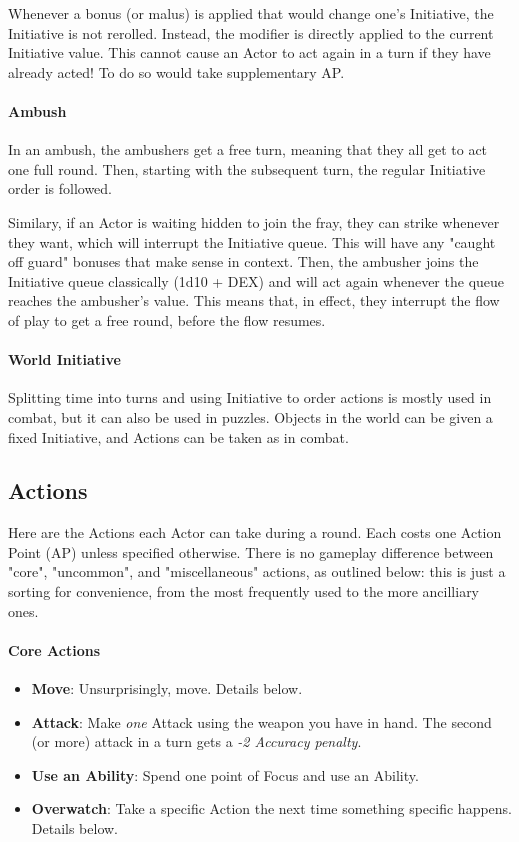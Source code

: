 Whenever a bonus (or malus) is applied that would change one's Initiative, the Initiative is not rerolled. Instead, the modifier is directly applied to the current Initiative value. This cannot cause an Actor to act again in a turn if they have already acted! To do so would take supplementary AP.


\paragraph{Ambush}

In an ambush, the ambushers get a free turn, meaning that they all get to act one full round. Then, starting with the subsequent turn, the regular Initiative order is followed.

Similary, if an Actor is waiting hidden to join the fray, they can strike whenever they want, which will interrupt the Initiative queue. This will have any "caught off guard" bonuses that make sense in context. Then, the ambusher joins the Initiative queue classically (1d10 + DEX) and will act again whenever the queue reaches the ambusher's value. This means that, in effect, they interrupt the flow of play to get a free round, before the flow resumes.

\paragraph{World Initiative} 

Splitting time into turns and using Initiative to order actions is mostly used in combat, but it can also be used in puzzles. Objects in the world can be given a fixed Initiative, and Actions can be taken as in combat. 


\subsection{Actions}
\label{actions}

Here are the Actions each Actor can take during a round. Each costs one Action Point (AP) unless specified otherwise. There is no gameplay difference between "core", "uncommon", and "miscellaneous" actions, as outlined below: this is just a sorting for convenience, from the most frequently used to the more ancilliary ones.

\paragraph{Core Actions}
\begin{itemize}
    \item \textbf{Move}: Unsurprisingly, move. Details below.
    \item \textbf{Attack}: Make \textit{one} Attack using the weapon you have in hand. The second (or more) attack in a turn gets a \textit{-2 Accuracy penalty}.
    \item \textbf{Use an Ability}: Spend one point of Focus and use an Ability.
    \item \textbf{Overwatch}: Take a specific Action the next time something specific happens. Details below.
\end{itemize}

